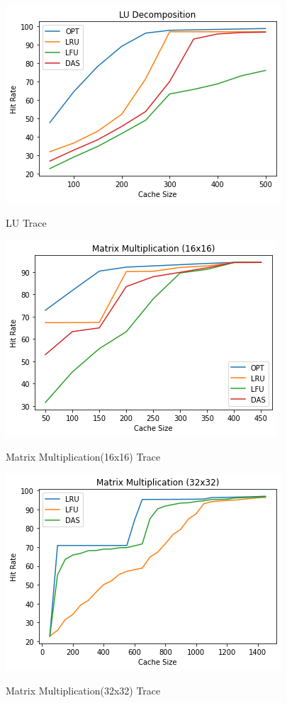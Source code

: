 \documentclass[conference]{IEEEtran}
\begin{document}
 \begin{figure}
        \centering
       \includegraphics[scale=0.6]{lu.png}~
       \caption{LU Trace}\label{Fig:1}
 \end{figure}

 \begin{figure}
        \centering
       \includegraphics[scale=0.6]{mm16.png}~
       \caption{Matrix Multiplication(16x16) Trace}\label{Fig:1}
 \end{figure}

 \begin{figure}
        \centering
       \includegraphics[scale=0.6]{mm32.png}~
       \caption{Matrix Multiplication(32x32) Trace}\label{Fig:1}
 \end{figure}
\end{document}
